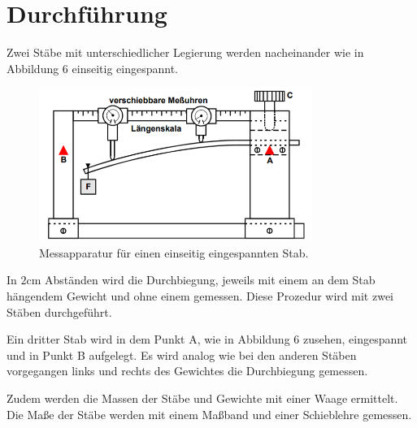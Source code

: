 \section{Durchführung}
\label{sec:Durchführung}


Zwei Stäbe mit unterschiedlicher Legierung werden nacheinander wie in Abbildung 6 einseitig eingespannt.

\begin{figure}[H]
  \centering
  \includegraphics[height=5cm]{einseitig.PNG}
  \caption{Messapparatur für einen einseitig eingespannten Stab. \cite{sample}}
  \label{fig:einseitig}
\end{figure}

In $2$cm Abständen wird die Durchbiegung, jeweils mit einem an dem Stab hängendem Gewicht
und ohne einem gemessen. Diese Prozedur wird mit zwei Stäben durchgeführt.

Ein dritter Stab wird in dem Punkt A, wie in Abbildung 6 zusehen, eingespannt und
in Punkt B aufgelegt. Es wird analog wie bei den anderen Stäben vorgegangen links
und rechts des Gewichtes die Durchbiegung gemessen.

Zudem werden die Massen der Stäbe und Gewichte mit einer Waage ermittelt. Die Maße der
Stäbe werden mit einem Maßband und einer Schieblehre gemessen.
